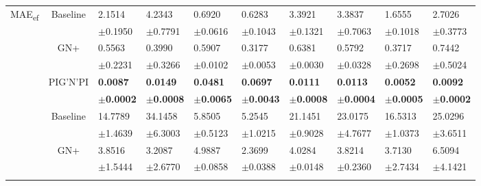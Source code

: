 \documentclass{article}
\newcommand{\pignpi}{PIG'N'PI\xspace}
\newcommand{\lemos}{GN+\xspace}
\begin{document}
\begin{table}[h!]
{\begin{tabularx}{\textwidth}{ccXXXXXXXX}
        \multirow{6}{*}{\textsf{MAE\textsubscript{ef}}}

        &\multirow{2}{*}{Baseline}
        & 2.1514 & 4.2343 & 0.6920 & 0.6283 & 3.3921 & 3.3837 & 1.6555 & 2.7026\\
        &&\scriptsize$\pm$0.1950 & \scriptsize $\pm$0.7791 & \scriptsize $\pm$0.0616 & \scriptsize $\pm$0.1043 & \scriptsize $\pm$0.1321 & \scriptsize $\pm$0.7063 & \scriptsize $\pm$0.1018 & \scriptsize $\pm$0.3773\\
        \cline{3-10}\rule{0pt}{2.3ex}
        
        &\multirow{2}{*}{\lemos}
        &0.5563 & 0.3990 & 0.5907 & 0.3177 & 0.6381 & 0.5792 & 0.3717 & 0.7442\\
        &&\scriptsize$\pm$0.2231&\scriptsize$\pm$0.3266&\scriptsize$\pm$0.0102&\scriptsize$\pm$0.0053&\scriptsize$\pm$0.0030&\scriptsize$\pm$0.0328&\scriptsize$\pm$0.2698&\scriptsize$\pm$0.5024\\
        \cline{3-10}\rule{0pt}{2.3ex}

        &\multirow{2}{*}{\pignpi}
        & \textbf{0.0087} & \textbf{0.0149} & \textbf{0.0481} & \textbf{0.0697} & \textbf{0.0111} & \textbf{0.0113} & \textbf{0.0052} & \textbf{0.0092}\\
        && \scriptsize \textbf{$\pm$0.0002} & \scriptsize \textbf{$\pm$0.0008} & \scriptsize \textbf{$\pm$0.0065} & \scriptsize \textbf{$\pm$0.0043} & \scriptsize \textbf{$\pm$0.0008} & \scriptsize \textbf{$\pm$0.0004} & \scriptsize \textbf{$\pm$0.0005} & \scriptsize \textbf{$\pm$0.0002}\\
        \hline\rule{0pt}{2.3ex}

        \multirow{6}{*}{\textsf{MAE\textsubscript{nf}}}

        &\multirow{2}{*}{Baseline}
        &14.7789 & 34.1458 & 5.8505 & 5.2545 & 21.1451 & 23.0175 & 16.5313 & 25.0296\\
        &&\scriptsize$\pm$1.4639 & \scriptsize $\pm$6.3003 & \scriptsize $\pm$0.5123 & \scriptsize $\pm$1.0215 & \scriptsize $\pm$0.9028 & \scriptsize $\pm$4.7677 & \scriptsize $\pm$1.0373 & \scriptsize $\pm$3.6511 \\
        \cline{3-10}\rule{0pt}{2.3ex}
        
        &\multirow{2}{*}{\lemos}
        &3.8516 & 3.2087 & 4.9887 & 2.3699 & 4.0284 & 3.8214 & 3.7130 & 6.5094\\
        &&\scriptsize$\pm$1.5444&\scriptsize$\pm$2.6770&\scriptsize$\pm$0.0858&\scriptsize$\pm$0.0388&\scriptsize$\pm$0.0148&\scriptsize$\pm$0.2360&\scriptsize$\pm$2.7434&\scriptsize$\pm$4.1421\\
        \cline{3-10}\rule{0pt}{2.3ex}


\end{tabularx}}
\end{table}
\end{document}
